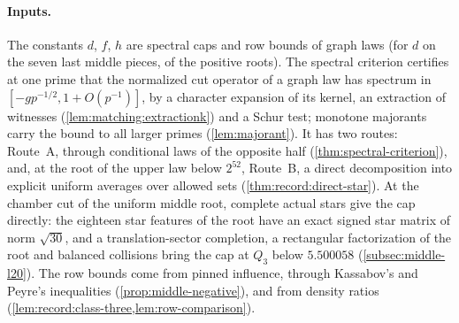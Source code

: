\paragraph{Inputs.}
The constants $d$, $f$, $h$ are spectral caps and row bounds of graph laws
(for $d$ on the seven last middle pieces, of the positive roots). The
spectral criterion certifies at one prime that the normalized cut operator of
a graph law has spectrum in $[-gp^{-1/2},1+O(p^{-1})]$, by a character expansion
of its kernel, an extraction of witnesses (\cref{lem:matching:extractionk}) and
a Schur test; monotone majorants carry the bound to all larger primes
(\cref{lem:majorant}). It has two routes: Route~A, through
conditional laws of the opposite half
(\cref{thm:spectral-criterion}), and, at the root of the upper law
below $2^{52}$, Route~B, a direct decomposition into explicit
uniform averages over allowed sets
(\cref{thm:record:direct-star}). At the chamber cut of the uniform middle
root, complete actual stars give the cap directly: the eighteen star features
of the root have an exact signed star matrix of norm $\sqrt{30}$, and a
translation-sector completion, a rectangular factorization of the root and
balanced collisions bring the cap at $Q_3$ below $5.500058$
(\cref{subsec:middle-l20}). The row bounds
come from pinned influence, through Kassabov's and Peyre's inequalities
(\cref{prop:middle-negative}), and from density ratios
(\cref{lem:record:class-three,lem:row-comparison}).

